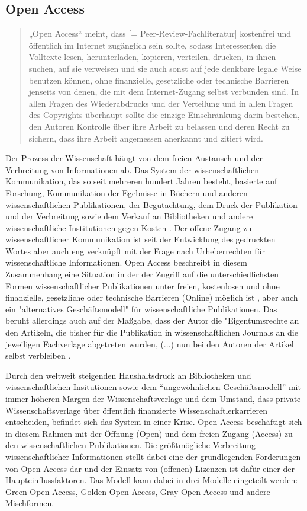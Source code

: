 \subsection{Open Access} 
\begin{quote}
„Open Access“ meint, dass [= Peer-Review-Fachliteratur] kostenfrei und öffentlich im Internet zugänglich sein sollte, sodass Interessenten die Volltexte lesen, herunterladen, kopieren, verteilen, drucken, in ihnen suchen, auf sie verweisen und sie auch sonst auf jede denkbare legale Weise benutzen können, ohne finanzielle, gesetzliche oder technische Barrieren jenseits von denen, die mit dem Internet-Zugang selbst verbunden sind. In allen Fragen des Wiederabdrucks und der Verteilung und in allen Fragen des Copyrights überhaupt sollte die einzige Einschränkung darin bestehen, den Autoren Kontrolle über ihre Arbeit zu belassen und deren Recht zu sichern, dass ihre Arbeit angemessen anerkannt und zitiert wird.
\cite{boai_2012}
\end{quote}
Der Prozess der Wissenschaft hängt von dem freien Austausch und der Verbreitung von Informationen ab\cite{cite:11}. Das System der wissenschaftlichen Kommunikation, das so seit mehreren hundert Jahren besteht, basierte auf Forschung, Kommunikation der Egebnisse in Büchern und anderen wissenschaftlichen Publikationen, der Begutachtung, dem Druck der Publikation und der Verbreitung sowie dem Verkauf an Bibliotheken und andere wissenschaftliche Institutionen gegen Kosten \cite{cite:11a}. Der offene Zugang zu wissenschaftlicher Kommunikation ist seit der Entwicklung des gedruckten Wortes aber auch eng verknüpft mit der Frage nach Urheberrechten für wissenschaftliche Informationen\cite{Case_2000}. Open Access beschreibt in diesem Zusammenhang eine Situation in der der Zugriff auf die unterschiedlichsten Formen wissenschaftlicher Publikationen unter freien, kostenlosen und ohne finanzielle, gesetzliche oder technische Barrieren (Online) möglich ist \cite{WD_bundestag_2009}, aber auch ein "alternatives Geschäftsmodell"\cite{lewis_2012_inevitability} für wissenschaftliche Publikationen. Das beruht allerdings auch auf der Maßgabe, dass der Autor die "Eigentumsrechte an den Artikeln, die bisher für die Publikation in wissenschaftlichen Journals an die jeweiligen Fachverlage abgetreten wurden, (...) nun bei den Autoren der Artikel selbst verbleiben \cite{Hess_2006}. 

Durch den weltweit steigenden Haushaltsdruck an Bibliotheken und wissenschaftlichen Insitutionen sowie dem “ungewöhnlichen Geschäftsmodell”\cite{cite:12} mit immer höheren Margen der Wissenschaftsverlage\cite{albert_2006_open_implications} und dem Umstand, dass private Wissenschaftsverlage über öffentlich finanzierte Wissenschaftlerkarrieren entscheiden\cite{heise_2012}, befindet sich das System in einer Krise\cite{cite:14}. Open Access beschäftigt sich in diesem Rahmen mit der Öffnung (Open) und dem freien Zugang (Access) zu den wissenschaftlichen Publikationen. Die größtmögliche Verbreitung wissenschaftlicher Informationen stellt dabei eine der grundlegenden Forderungen von Open Access dar\cite{cite:15} und der Einsatz von (offenen) Lizenzen ist dafür einer der Haupteinflussfaktoren\cite{cite:16}. Das Modell kann dabei in drei Modelle eingeteilt werden: Green Open Access, Golden Open Access, Gray Open Access und andere Mischformen.

